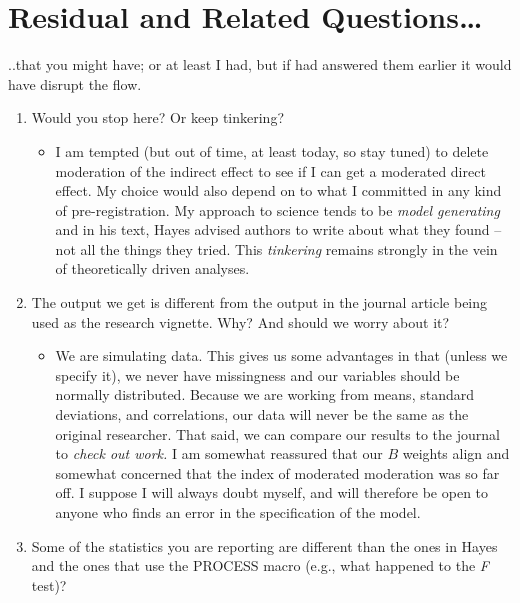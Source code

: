 \documentclass[
  english,
]{book}
\providecommand{\tightlist}{%
  \setlength{\itemsep}{0pt}\setlength{\parskip}{0pt}}
\begin{document}
\hypertarget{residual-and-related-questions-1}{%
\section{Residual and Related Questions\ldots{}}\label{residual-and-related-questions-1}}

..that you might have; or at least I had, but if had answered them earlier it would have disrupt the flow.

\begin{enumerate}
\def\labelenumi{\arabic{enumi}.}
\tightlist
\item
  Would you stop here? Or keep tinkering?

  \begin{itemize}
  \tightlist
  \item
    I am tempted (but out of time, at least today, so stay tuned) to delete moderation of the indirect effect to see if I can get a moderated direct effect. My choice would also depend on to what I committed in any kind of pre-registration. My approach to science tends to be \emph{model generating} \citep{bollen_testing_1993} and in his text, Hayes \citeyearpar{hayes_introduction_2018} advised authors to write about what they found -- not all the things they tried. This \emph{tinkering} remains strongly in the vein of theoretically driven analyses.
  \end{itemize}
\item
  The output we get is different from the output in the journal article being used as the research vignette. Why? And should we worry about it?

  \begin{itemize}
  \tightlist
  \item
    We are simulating data. This gives us some advantages in that (unless we specify it), we never have missingness and our variables should be normally distributed. Because we are working from means, standard deviations, and correlations, our data will never be the same as the original researcher. That said, we can compare our results to the journal to \emph{check out work.} I am somewhat reassured that our \(B\) weights align and somewhat concerned that the index of moderated moderation was so far off. I suppose I will always doubt myself, and will therefore be open to anyone who finds an error in the specification of the model.
  \end{itemize}
\item
  Some of the statistics you are reporting are different than the ones in Hayes and the ones that use the PROCESS macro (e.g., what happened to the \emph{F} test)?


\end{enumerate}
\end{document}
